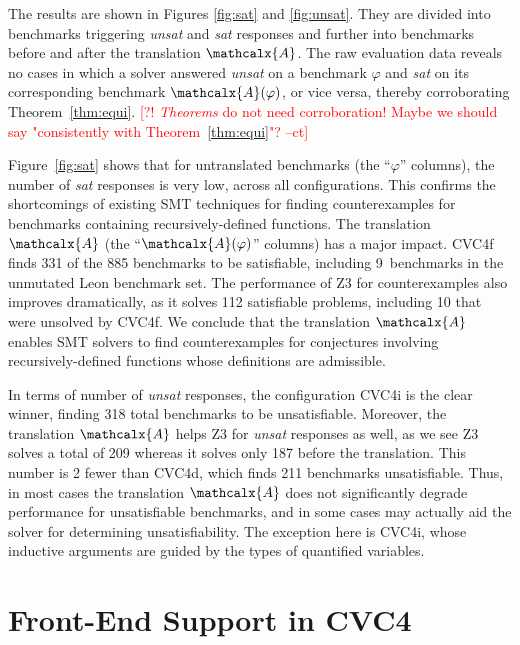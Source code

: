\documentclass[runningheads,a4paper]{llncs}
\newcommand\cvcd{{\cvc}d\xspace}
\newcommand\cvcf{{\cvc}f\xspace}
\newcommand\cvci{{\cvc}i\xspace}
\newcommand\ziiib{\ziii}
\newcommand\leon{Leon\xspace}
\newcommand\cvc{CVC4\xspace}
\newcommand\ziii{Z3\xspace}
\newcommand{\conv}{\mathcalx{A}}
\newcommand{\rem}[1]{\textcolor{red}{[#1]}}
\newcommand{\ct}[1]{\rem{#1 --ct}}
\begin{document}
The results are shown in Figures \ref{fig:sat} and \ref{fig:unsat}.
They are divided into benchmarks triggering \emph{unsat} and \emph{sat}
responses and further into benchmarks before and after the translation $\conv$.
The raw evaluation data reveals no cases in which a solver answered
\emph{unsat} on a benchmark $\varphi$ and \emph{sat} on its
corresponding benchmark $\conv( \varphi )$, or vice versa, 
thereby corroborating Theorem~\ref{thm:equi}.
\ct{?! \emph{Theorems} do not need corroboration! 
Maybe we should say "consistently with Theorem~\ref{thm:equi}"?}

Figure~\ref{fig:sat} shows that for untranslated benchmarks (the ``$\varphi$''
columns), the number of \emph{sat} responses is very low, across all
configurations. This confirms the shortcomings of existing SMT techniques for
finding counterexamples for benchmarks containing recursively-defined functions.
%
The translation $\conv$ (the ``$\conv(\varphi)$'' columns) has a major
impact. \cvcf finds 331 of the 885 benchmarks to be satisfiable,
including 9~benchmarks in the unmutated \leon benchmark set. The
performance of \ziiib for counterexamples also improves dramatically, as it
solves 112 satisfiable problems, including 10 that were unsolved by \cvcf.
%
We conclude that the translation $\conv$ enables SMT
solvers to find counterexamples for conjectures involving recursively-defined functions
whose definitions are admissible.

In terms of number of \emph{unsat} responses, the configuration \cvci is the
clear winner, finding 318 total benchmarks to be unsatisfiable. Moreover, the
translation $\conv$ helps \ziii for \emph{unsat} responses as well, as we
see \ziii solves a total of 209 whereas it solves only 187 before the
translation.
%
This number is 2 fewer than \cvcd, which finds 211 benchmarks unsatisfiable. Thus, in
most cases the translation $\conv$ does not significantly degrade performance
for unsatisfiable benchmarks, and in some cases may actually aid the solver for
determining unsatisfiability. The exception here is \cvci, whose inductive
arguments are guided by the types of quantified variables.

\section{Front-End Support in \cvc}
\label{sec:front-end}
\end{document}
